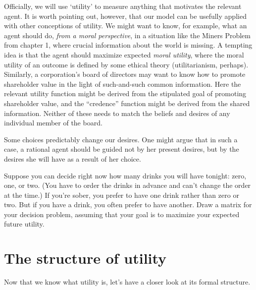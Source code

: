 Officially, we will use `utility' to measure anything that motivates the
relevant agent. It is worth pointing out, however, that our model can be usefully
applied with other conceptions of utility. We might want to know, for example,
what an agent should do, \emph{from a moral perspective}, in a situation like
the Miners Problem from chapter 1, where crucial information about the world is
missing. A tempting idea is that the agent should maximize expected \emph{moral
  utility}, where the moral utility of an outcome is defined by some ethical
theory (utilitarianism, perhaps). Similarly, a corporation's board of directors
may want to know how to promote shareholder value in the light of such-and-such
common information. Here the relevant utility function might be derived from the
stipulated goal of promoting shareholder value, and the ``credence'' function
might be derived from the shared information. Neither of these needs to match
the beliefs and desires of any individual member of the board.

\begin{exercise}{3}
  Some choices predictably change our desires. One might argue that in such
  a case, a rational agent should be guided not by her present desires, but by
  the desires she will have as a result of her choice.

  Suppose you can decide right now how many drinks you will have tonight: zero,
  one, or two. (You have to order the drinks in advance and can't change the
  order at the time.) If you're sober, you prefer to have one drink rather than
  zero or two. But if you have a drink, you often prefer to have another. Draw a
  matrix for your decision problem, assuming that your goal is to maximize your
  expected future utility.
\end{exercise}


\section{The structure of utility}\label{sec:structure-of-utility}

Now that we know what utility is, let's have a closer look at its formal
structure.

